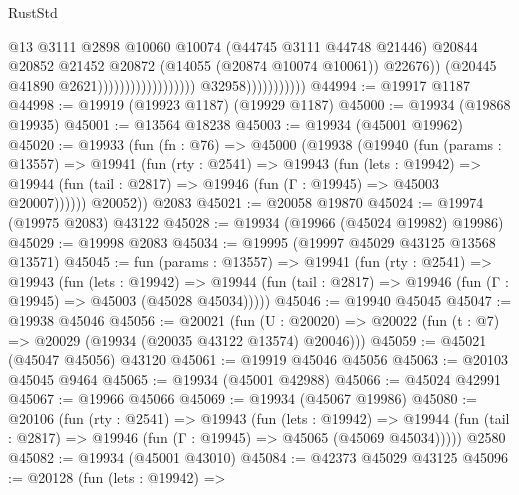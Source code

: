 \begin{lexlean}{RustStd}
\begin{coremodule}
                                                                @13
                                                                @3111
                                                                @2898
                                                                @10060
                                                                @10074
                                                                (@44745 @3111 @44748 @21446)
                                                                @20844
                                                                @20852
                                                                @21452
                                                                @20872
                                                                (@14055 (@20874 @10074 @10061))
                                                                @22676))
                                                            (@20445 @41890 @2621))))))))))))))))))
                          @32958)))))))))))
@44994 := @19917 @1187
@44998 := @19919 (@19923 @1187) (@19929 @1187)
@45000 := @19934 (@19868 @19935)
@45001 := @13564 @18238
@45003 := @19934 (@45001 @19962)
@45020 := @19933
    (fun (fn : @76) =>
    @45000
      (@19938
        (@19940
          (fun (params : @13557) =>
          @19941
            (fun (rty : @2541) =>
            @19943
              (fun (lets : @19942) =>
              @19944 (fun (tail : @2817) => @19946 (fun (Γ : @19945) => @45003 @20007))))))
        @20052))
    @2083
@45021 := @20058 @19870
@45024 := @19974 (@19975 @2083) @43122
@45028 := @19934 (@19966 (@45024 @19982) @19986)
@45029 := @19998 @2083
@45034 := @19995 (@19997 @45029 @43125 @13568 @13571)
@45045 := fun (params : @13557) =>
  @19941
    (fun (rty : @2541) =>
    @19943
      (fun (lets : @19942) =>
      @19944 (fun (tail : @2817) => @19946 (fun (Γ : @19945) => @45003 (@45028 @45034)))))
@45046 := @19940 @45045
@45047 := @19938 @45046
@45056 := @20021
    (fun (U : @20020) => @20022 (fun (t : @7) => @20029 (@19934 (@20035 @43122 @13574) @20046)))
@45059 := @45021 (@45047 @45056) @43120
@45061 := @19919 @45046 @45056
@45063 := @20103 @45045 @9464
@45065 := @19934 (@45001 @42988)
@45066 := @45024 @42991
@45067 := @19966 @45066
@45069 := @19934 (@45067 @19986)
@45080 := @20106
    (fun (rty : @2541) =>
    @19943
      (fun (lets : @19942) =>
      @19944 (fun (tail : @2817) => @19946 (fun (Γ : @19945) => @45065 (@45069 @45034)))))
    @2580
@45082 := @19934 (@45001 @43010)
@45084 := @42373 @45029 @43125
@45096 := @20128
    (fun (lets : @19942) =>

\end{coremodule}
\end{lexlean}
